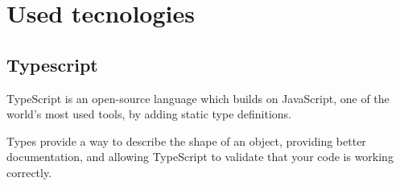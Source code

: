 \section{Used tecnologies}
\subsection{Typescript}
TypeScript is an open-source language which builds on JavaScript, one of the world’s most used tools, by adding static type definitions.

Types provide a way to describe the shape of an object, providing better documentation, and allowing TypeScript to validate that your code is working correctly.